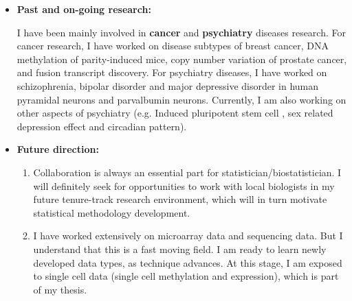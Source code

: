 \documentclass[a4paper, 10pt]{article}
\begin{document}
\begin{itemize}
\item \textbf{Past and on-going research:}

I have been mainly involved in \textbf{cancer} and \textbf{psychiatry} diseases research.
For cancer research, I have worked on disease subtypes of breast cancer\cite{ref:ILC},
DNA methylation of parity-induced mice\cite{ref:mouseParity}, 
copy number variation of prostate cancer\cite{ref:prostate},
and fusion transcript discovery\cite{ref:fusionGene}.
For psychiatry diseases,
I have worked on schizophrenia, bipolar disorder and major depressive disorder in human pyramidal neurons\cite{ref:MO1} and parvalbumin neurons\cite{ref:PVL3}.
Currently, I am also working on other aspects of psychiatry (e.g. Induced pluripotent stem cell \cite{ref:iPSC}, sex related depression effect \cite{ref:SexBLA, ref:SexAcross} and circadian pattern).

\item \textbf{Future direction:}
\begin{enumerate}
\item Collaboration is always an essential part for statistician/biostatistician.
I will definitely seek for opportunities to work with local biologists in my future tenure-track research environment, 
which will in turn motivate statistical methodology development.
\item I have worked extensively on microarray data and sequencing data.
But I understand that this is a fast moving field.
I am ready to learn newly developed data types, as technique advances.
At this stage, I am exposed to single cell data (single cell methylation and expression),
which is part of my thesis.
\end{enumerate}
\end{itemize}
\end{document}
